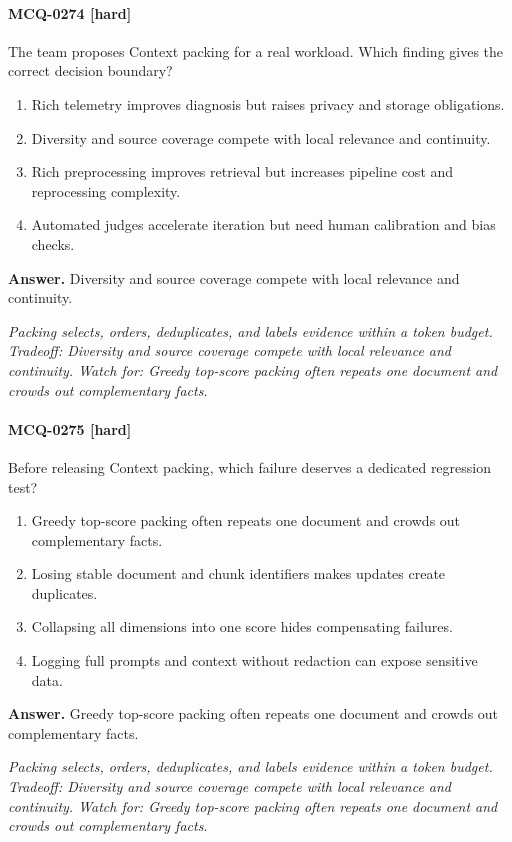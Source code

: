 \paragraph{MCQ-0274 [hard]} The team proposes Context packing for a real workload. Which finding gives the correct decision boundary?
\begin{enumerate}[label=\Alph*.]
\item Rich telemetry improves diagnosis but raises privacy and storage obligations.
\item Diversity and source coverage compete with local relevance and continuity.
\item Rich preprocessing improves retrieval but increases pipeline cost and reprocessing complexity.
\item Automated judges accelerate iteration but need human calibration and bias checks.
\end{enumerate}
\noindent\textbf{Answer.} Diversity and source coverage compete with local relevance and continuity.
\par\textit{Packing selects, orders, deduplicates, and labels evidence within a token budget. Tradeoff: Diversity and source coverage compete with local relevance and continuity. Watch for: Greedy top-score packing often repeats one document and crowds out complementary facts.}
\paragraph{MCQ-0275 [hard]} Before releasing Context packing, which failure deserves a dedicated regression test?
\begin{enumerate}[label=\Alph*.]
\item Greedy top-score packing often repeats one document and crowds out complementary facts.
\item Losing stable document and chunk identifiers makes updates create duplicates.
\item Collapsing all dimensions into one score hides compensating failures.
\item Logging full prompts and context without redaction can expose sensitive data.
\end{enumerate}
\noindent\textbf{Answer.} Greedy top-score packing often repeats one document and crowds out complementary facts.
\par\textit{Packing selects, orders, deduplicates, and labels evidence within a token budget. Tradeoff: Diversity and source coverage compete with local relevance and continuity. Watch for: Greedy top-score packing often repeats one document and crowds out complementary facts.}
